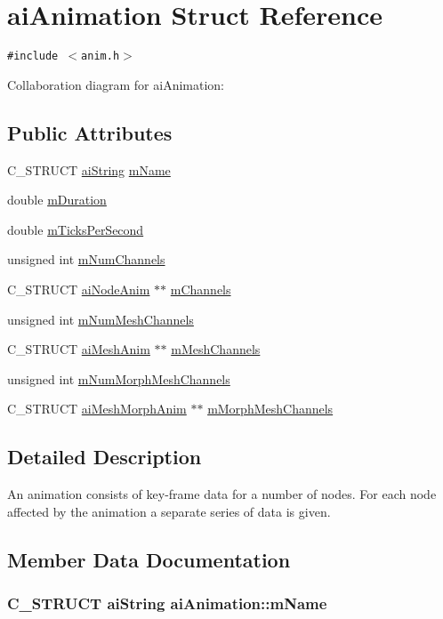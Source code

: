 \hypertarget{structai_animation}{
\section{aiAnimation Struct Reference}
\label{structai_animation}
}
{\tt \#include $<$anim.h$>$}

Collaboration diagram for aiAnimation:\subsection*{Public Attributes}
\begin{CompactItemize}
\item 
C\_\-STRUCT \hyperlink{structai_string}{aiString} \hyperlink{structai_animation_1be7d78d88694173a7ceef658fea77f1}{mName}
\item 
double \hyperlink{structai_animation_e2bbc49320b4b75c05e23e0ab704ece7}{mDuration}
\item 
double \hyperlink{structai_animation_fd26a40c3f16b6aa6e150effa3eaeab1}{mTicksPerSecond}
\item 
unsigned int \hyperlink{structai_animation_ebfccf9a9aefa6084566d21e8a30b7e5}{mNumChannels}
\item 
C\_\-STRUCT \hyperlink{structai_node_anim}{aiNodeAnim} $\ast$$\ast$ \hyperlink{structai_animation_89244bb68b725ffbb85137174c28e757}{mChannels}
\item 
unsigned int \hyperlink{structai_animation_c43aacd8502020174e553501f0b6bf5f}{mNumMeshChannels}
\item 
C\_\-STRUCT \hyperlink{structai_mesh_anim}{aiMeshAnim} $\ast$$\ast$ \hyperlink{structai_animation_f05138121dbde8b31aa031505b454c85}{mMeshChannels}
\item 
unsigned int \hyperlink{structai_animation_ed9aa50bdf38c9f6064f79f5aab38d59}{mNumMorphMeshChannels}
\item 
C\_\-STRUCT \hyperlink{structai_mesh_morph_anim}{aiMeshMorphAnim} $\ast$$\ast$ \hyperlink{structai_animation_bcc055a00bed8ce3329fdf4a9c22ec9c}{mMorphMeshChannels}
\end{CompactItemize}


\subsection{Detailed Description}
An animation consists of key-frame data for a number of nodes. For each node affected by the animation a separate series of data is given. 

\subsection{Member Data Documentation}
\hypertarget{structai_animation_1be7d78d88694173a7ceef658fea77f1}{
\subsubsection[mName]{\setlength{\rightskip}{0pt plus 5cm}C\_\-STRUCT {\bf aiString} {\bf aiAnimation::mName}}}
\label{structai_animation_1be7d78d88694173a7ceef658fea77f1}


